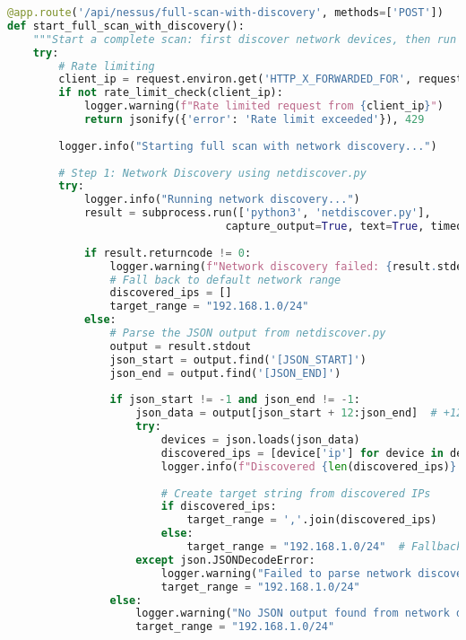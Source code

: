 \documentclass[12pt,a4paper]{report}
\begin{document}
\begin{lstlisting}[language=Python,caption={Full Network Scan with Discovery}]
@app.route('/api/nessus/full-scan-with-discovery', methods=['POST'])
def start_full_scan_with_discovery():
    """Start a complete scan: first discover network devices, then run Nessus scan on discovered IPs"""
    try:
        # Rate limiting
        client_ip = request.environ.get('HTTP_X_FORWARDED_FOR', request.remote_addr)
        if not rate_limit_check(client_ip):
            logger.warning(f"Rate limited request from {client_ip}")
            return jsonify({'error': 'Rate limit exceeded'}), 429
        
        logger.info("Starting full scan with network discovery...")
        
        # Step 1: Network Discovery using netdiscover.py
        try:
            logger.info("Running network discovery...")
            result = subprocess.run(['python3', 'netdiscover.py'], 
                                  capture_output=True, text=True, timeout=120)
            
            if result.returncode != 0:
                logger.warning(f"Network discovery failed: {result.stderr}")
                # Fall back to default network range
                discovered_ips = []
                target_range = "192.168.1.0/24"
            else:
                # Parse the JSON output from netdiscover.py
                output = result.stdout
                json_start = output.find('[JSON_START]')
                json_end = output.find('[JSON_END]')
                
                if json_start != -1 and json_end != -1:
                    json_data = output[json_start + 12:json_end]  # +12 to skip '[JSON_START]'
                    try:
                        devices = json.loads(json_data)
                        discovered_ips = [device['ip'] for device in devices if device.get('ip')]
                        logger.info(f"Discovered {len(discovered_ips)} network devices")
                        
                        # Create target string from discovered IPs
                        if discovered_ips:
                            target_range = ','.join(discovered_ips)
                        else:
                            target_range = "192.168.1.0/24"  # Fallback
                    except json.JSONDecodeError:
                        logger.warning("Failed to parse network discovery JSON output")
                        target_range = "192.168.1.0/24"
                else:
                    logger.warning("No JSON output found from network discovery")
                    target_range = "192.168.1.0/24"
        

\end{lstlisting}
\end{document}
